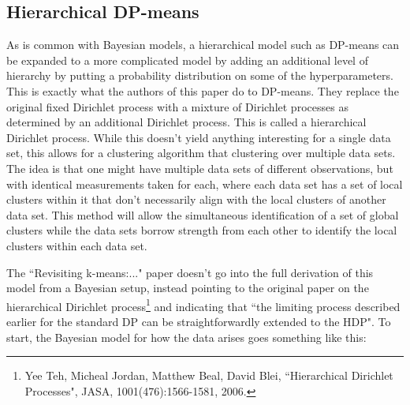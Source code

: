 \documentclass[11pt]{article}
\theoremstyle{definition}
\begin{document}
\subsection{Hierarchical DP-means}
As is common with Bayesian models, a hierarchical model such as DP-means can be expanded to a more complicated model by adding an additional level of hierarchy by putting a probability distribution on some of the hyperparameters. This is exactly what the authors of this paper do to DP-means. They replace the original fixed Dirichlet process with a mixture of Dirichlet processes as determined by an additional Dirichlet process. This is called a hierarchical Dirichlet process. While this doesn't yield anything interesting for a single data set, this allows for a clustering algorithm that clustering over multiple data sets. The idea is that one might have multiple data sets of different observations, but with identical measurements taken for each, where each data set has a set of local clusters within it that don't necessarily align with the local clusters of another data set. This method will allow the simultaneous identification of a set of global clusters while the data sets borrow strength from each other to identify the local clusters within each data set. \par
The ``Revisiting k-means:..." paper doesn't go into the full derivation of this model from a Bayesian setup, instead pointing to the original paper on the hierarchical Dirichlet process\footnote{Yee Teh, Micheal Jordan, Matthew Beal, David Blei, ``Hierarchical Dirichlet Processes", JASA, 1001(476):1566-1581, 2006.} and indicating that ``the limiting process described earlier for the standard DP can be straightforwardly extended to the HDP". To start, the Bayesian model for how the data arises goes something like this:
\end{document}
